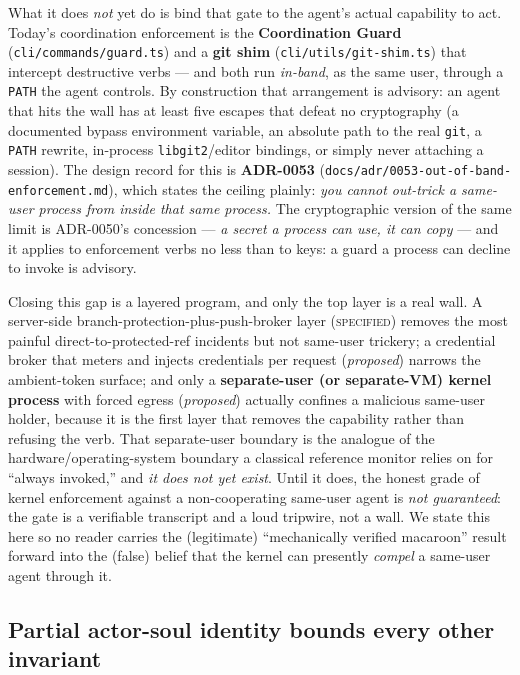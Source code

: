 \documentclass[11pt,a4paper]{article}
\newcommand{\Designed}{{\textcolor{hhgray}{\textsc{specified}}}}
\newcommand{\Vision}{{\textcolor{hhgray}{\textit{proposed}}}}
\newcommand{\NotGuar}{{\textcolor{hhink}{\textit{not guaranteed}}}}
\theoremstyle{definition}
\theoremstyle{remark}
\begin{document}
What it does \emph{not} yet do is bind that gate to the agent's actual capability
to act. Today's coordination enforcement is the \textbf{Coordination Guard}
(\texttt{cli/commands/guard.ts}) and a \textbf{git shim}
(\texttt{cli/utils/git-shim.ts}) that intercept destructive verbs --- and both run
\emph{in-band}, as the same user, through a \texttt{PATH} the agent controls. By
construction that arrangement is advisory: an agent that hits the wall has at least
five escapes that defeat no cryptography (a documented bypass environment variable,
an absolute path to the real \texttt{git}, a \texttt{PATH} rewrite, in-process
\texttt{libgit2}/editor bindings, or simply never attaching a session). The design
record for this is \textbf{ADR-0053} (\texttt{docs/adr/0053-out-of-band-enforcement.md}),
which states the ceiling plainly: \emph{you cannot out-trick a same-user process
from inside that same process.} The cryptographic version of the same limit is
ADR-0050's concession --- \emph{a secret a process can use, it can copy} --- and it
applies to enforcement verbs no less than to keys: a guard a process can decline to
invoke is advisory.

Closing this gap is a layered program, and only the top layer is a real wall. A
server-side branch-protection-plus-push-broker layer (\Designed) removes the most
painful direct-to-protected-ref incidents but not same-user trickery; a credential
broker that meters and injects credentials per request (\Vision) narrows the
ambient-token surface; and only a \textbf{separate-user (or separate-VM) kernel
process} with forced egress (\Vision) actually confines a malicious same-user
holder, because it is the first layer that removes the capability rather than
refusing the verb. That separate-user boundary is the analogue of the
hardware/operating-system boundary a classical reference monitor relies on for
``always invoked,'' and \emph{it does not yet exist}. Until it does, the honest
grade of kernel enforcement against a non-cooperating same-user agent is
\NotGuar: the gate is a verifiable transcript and a loud tripwire, not a wall. We
state this here so no reader carries the (legitimate) ``mechanically verified
macaroon'' result forward into the (false) belief that the kernel can presently
\emph{compel} a same-user agent through it.

\subsection{Partial actor-soul identity bounds every other invariant}
\end{document}
